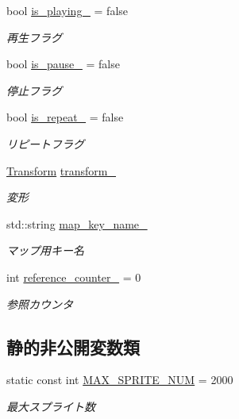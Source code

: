 \begin{DoxyCompactItemize}
bool \mbox{\hyperlink{class_effekseer_object_a4ec40aadcda493d25823d95a3035c29d}{is\+\_\+playing\+\_\+}} = false
\begin{DoxyCompactList}\small\item\em 再生フラグ \end{DoxyCompactList}\item 
bool \mbox{\hyperlink{class_effekseer_object_ad34fd902c49b1f68dc7b212fe9d2676d}{is\+\_\+pause\+\_\+}} = false
\begin{DoxyCompactList}\small\item\em 停止フラグ \end{DoxyCompactList}\item 
bool \mbox{\hyperlink{class_effekseer_object_a4beb29e4b63e4013d1916ccada3c5635}{is\+\_\+repeat\+\_\+}} = false
\begin{DoxyCompactList}\small\item\em リピートフラグ \end{DoxyCompactList}\item 
\mbox{\hyperlink{class_transform}{Transform}} \mbox{\hyperlink{class_effekseer_object_a53e096d7eebae5339b2df3c91bc30e7e}{transform\+\_\+}}
\begin{DoxyCompactList}\small\item\em 変形 \end{DoxyCompactList}\item 
std\+::string \mbox{\hyperlink{class_effekseer_object_a815d735c9c282cdee2ccfb734eb2bb57}{map\+\_\+key\+\_\+name\+\_\+}}
\begin{DoxyCompactList}\small\item\em マップ用キー名 \end{DoxyCompactList}\item 
int \mbox{\hyperlink{class_effekseer_object_ad7bcf0ab26c7601b005cc7d76eb39a9a}{reference\+\_\+counter\+\_\+}} = 0
\begin{DoxyCompactList}\small\item\em 参照カウンタ \end{DoxyCompactList}\end{DoxyCompactItemize}
\subsection*{静的非公開変数類}
\begin{DoxyCompactItemize}
\item 
static const int \mbox{\hyperlink{class_effekseer_object_a6edfdaac66134eee3264923075abb1f0}{M\+A\+X\+\_\+\+S\+P\+R\+I\+T\+E\+\_\+\+N\+UM}} = 2000
\begin{DoxyCompactList}\small\item\em 最大スプライト数 \end{DoxyCompactList}\end{DoxyCompactItemize}


